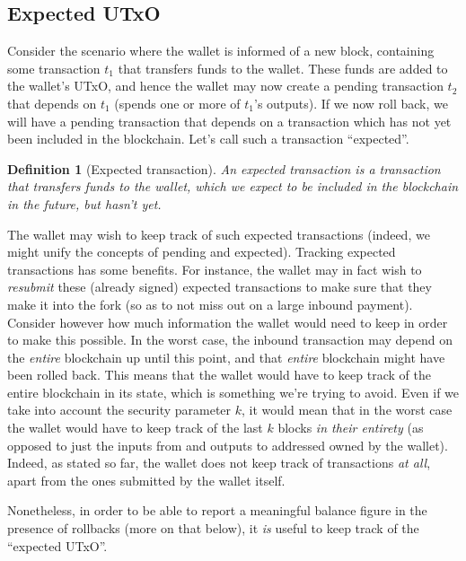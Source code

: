 \documentclass{article}
\newtheorem{definition}{Definition}
\begin{document}
\subsection{Expected UTxO}
\label{sec:expected_UTxO}

Consider the scenario where the wallet is informed of a new block, containing
some transaction $t_1$ that transfers funds to the wallet. These funds are
added to the wallet's UTxO, and hence the wallet may now create a pending
transaction $t_2$ that depends on $t_1$ (spends one or more of $t_1$'s outputs).
If we now roll back, we will have a pending transaction that depends on a
transaction which has not yet been included in the blockchain. Let's call
such a transaction ``expected''.

\begin{definition}[Expected transaction]
An expected transaction is a transaction that transfers funds \emph{to}
the wallet, which we expect to be included in the blockchain in the future,
but hasn't yet.
\end{definition}

The wallet may wish to keep track of such expected transactions (indeed, we
might unify the concepts of pending and expected). Tracking expected
transactions has some benefits. For instance, the wallet may in fact wish to
\emph{resubmit} these (already signed) expected transactions to make sure that
they make it into the fork (so as to not miss out on a large inbound payment).
Consider however how much information the wallet would need to keep in order
to make this possible. In the worst case, the inbound transaction may depend
on the \emph{entire} blockchain up until this point, and that \emph{entire}
blockchain might have been rolled back. This means that the wallet would have
to keep track of the entire blockchain in its state, which is something we're
trying to avoid. Even if we take into account the security parameter $k$, it
would mean that in the worst case the wallet would have to keep track of the
last $k$ blocks \emph{in their entirety} (as opposed to just the inputs from
and outputs to addressed owned by the wallet). Indeed, as stated so far,
the wallet does not keep track of transactions \emph{at all}, apart from the
ones submitted by the wallet itself.

Nonetheless, in order to be able to report a meaningful balance figure in
the presence of rollbacks (more on that below), it \emph{is} useful to keep
track of the ``expected UTxO''.
\end{document}
